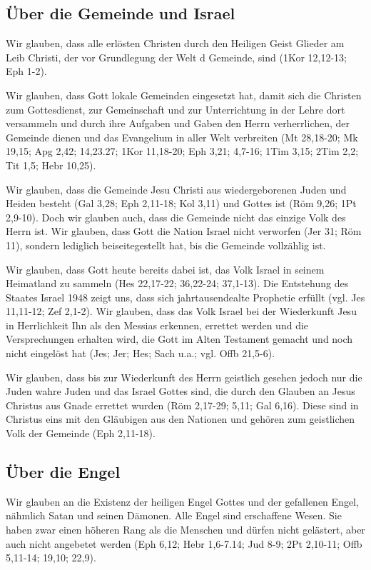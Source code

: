 \documentclass[12pt]{mybib}
\begin{document}
\subsection{Über die Gemeinde und Israel}
Wir glauben, dass alle erlösten Christen durch den Heiligen Geist Glieder am Leib Christi, der vor Grundlegung der Welt d Gemeinde, sind (1Kor 12,12-13; Eph 1-2).

Wir glauben, dass Gott lokale Gemeinden eingesetzt hat, damit sich die Christen zum Gottesdienst, zur Gemeinschaft und zur Unterrichtung in der Lehre dort versammeln und durch ihre Aufgaben und Gaben den Herrn verherrlichen, der Gemeinde dienen und das Evangelium in aller Welt verbreiten (Mt 28,18-20; Mk 19,15; Apg 2,42; 14,23.27; 1Kor 11,18-20; Eph 3,21; 4,7-16; 1Tim 3,15; 2Tim 2,2; Tit 1,5; Hebr 10,25).

Wir glauben, dass die Gemeinde Jesu Christi aus wiedergeborenen Juden und Heiden besteht (Gal 3,28; Eph 2,11-18; Kol 3,11) und Gottes ist (Röm 9,26; 1Pt 2,9-10). Doch wir glauben auch, dass die Gemeinde nicht das einzige Volk des Herrn ist. Wir glauben, dass Gott die Nation Israel nicht verworfen (Jer 31; Röm 11), sondern lediglich beiseitegestellt hat, bis die Gemeinde vollzählig ist.

Wir glauben, dass Gott heute bereits dabei ist, das Volk Israel in seinem Heimatland zu sammeln (Hes 22,17-22; 36,22-24; 37,1-13). Die Entstehung des Staates Israel 1948 zeigt uns, dass sich jahrtausendealte Prophetie erfüllt (vgl. Jes 11,11-12; Zef 2,1-2). Wir glauben, dass das Volk Israel bei der Wiederkunft Jesu in Herrlichkeit Ihn als den Messias erkennen, errettet werden und die Versprechungen erhalten wird, die Gott im Alten Testament gemacht und noch nicht eingelöst hat (Jes; Jer; Hes; Sach u.a.; vgl. Offb 21,5-6).

Wir glauben, dass bis zur Wiederkunft des Herrn geistlich gesehen jedoch nur die Juden \glqq wahre Juden\grqq{} und das \glqq Israel Gottes\grqq{} sind, die durch den Glauben an Jesus Christus aus Gnade errettet wurden (Röm 2,17-29; 5,11; Gal 6,16). Diese sind in Christus eins mit den Gläubigen aus den Nationen und gehören zum geistlichen Volk der Gemeinde (Eph 2,11-18).

\subsection{Über die Engel}
Wir glauben an die Existenz der heiligen Engel Gottes und der gefallenen Engel, nähmlich Satan und seinen Dämonen. Alle Engel sind erschaffene Wesen. Sie haben zwar einen höheren Rang als die Menschen und dürfen nicht gelästert, aber auch nicht angebetet werden (Eph 6,12; Hebr 1,6-7.14; Jud 8-9; 2Pt 2,10-11; Offb 5,11-14; 19,10; 22,9).
\end{document}
